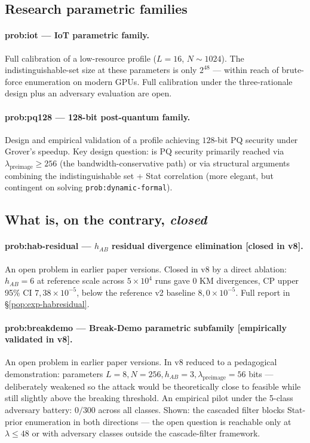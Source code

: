 \documentclass[11pt,a4paper]{article}
\begin{document}
\subsection{Research parametric families}

\paragraph{prob:iot --- IoT parametric family.} Full calibration of a low-resource profile ($L = 16$, $N \sim 1024$). The indistinguishable-set size at these parameters is only $2^{48}$ --- within reach of brute-force enumeration on modern GPUs. Full calibration under the three-rationale design plus an adversary evaluation are open.

\paragraph{prob:pq128 --- 128-bit post-quantum family.} Design and empirical validation of a profile achieving $128$-bit PQ security under Grover's speedup. Key design question: is PQ security primarily reached via $\lambda_\text{preimage} \geq 256$ (the bandwidth-conservative path) or via structural arguments combining the indistinguishable set + Stat correlation (more elegant, but contingent on solving \texttt{prob:dynamic-formal}).

\subsection{What is, on the contrary, \emph{closed}}

\paragraph{prob:hab-residual --- $h_{AB}$ residual divergence elimination \textbf{[closed in v8]}.} An open problem in earlier paper versions. Closed in v8 by a direct ablation: $h_{AB} = 6$ at reference scale across $5 \times 10^4$ runs gave $0$ KM divergences, CP upper 95\% CI $7{,}38 \times 10^{-5}$, below the reference v2 baseline $8{,}0 \times 10^{-5}$. Full report in §\ref{pop:exp-habresidual}.

\paragraph{prob:breakdemo --- Break-Demo parametric subfamily \textbf{[empirically validated in v8]}.} An open problem in earlier paper versions. In v8 reduced to a pedagogical demonstration: parameters $L = 8, N = 256, h_{AB} = 3, \lambda_\text{preimage} = 56$ bits --- deliberately weakened so the attack would be theoretically close to feasible while still slightly above the breaking threshold. An empirical pilot under the 5-class adversary battery: $0/300$ across all classes. Shown: the cascaded filter blocks Stat-prior enumeration in both directions --- the open question is reachable only at $\lambda \leq 48$ or with adversary classes outside the cascade-filter framework.
\end{document}
